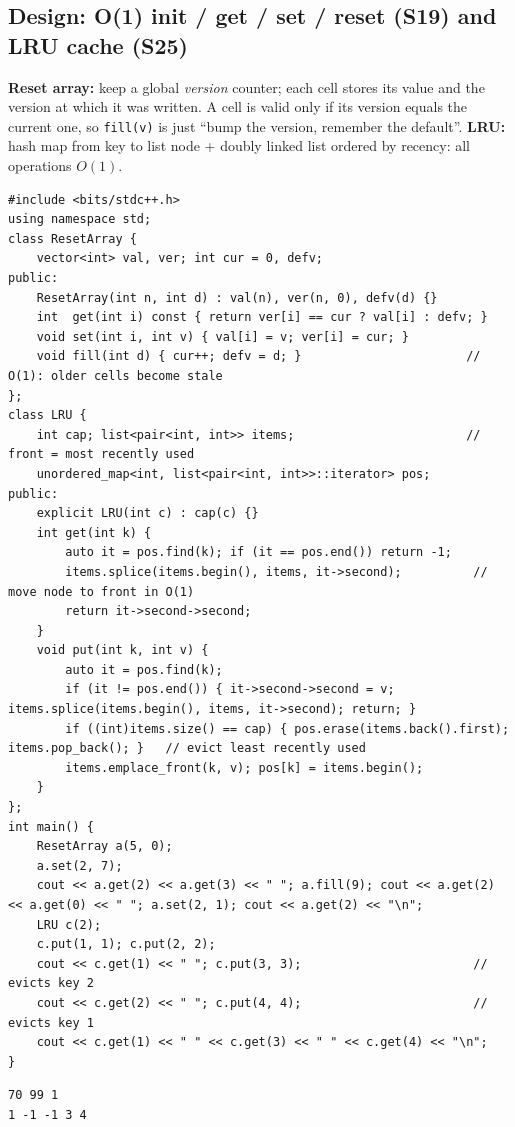 \documentclass[10pt,a4paper,openany,oneside]{report}
\begin{document}
\subsection{Design: O(1) init / get / set / reset (S19) and LRU cache (S25)}
\begin{srcbox}
\textbf{Reset array:} keep a global \emph{version} counter; each cell stores its value and the version at which it was written. A cell is valid only if its version equals the current one, so \texttt{fill(v)} is just ``bump the version, remember the default''.
\textbf{LRU:} hash map from key to list node + doubly linked list ordered by recency: all operations $O(1)$.
\end{srcbox}
\begin{lstlisting}[language={[11]C++}]
#include <bits/stdc++.h>
using namespace std;
class ResetArray {
    vector<int> val, ver; int cur = 0, defv;
public:
    ResetArray(int n, int d) : val(n), ver(n, 0), defv(d) {}
    int  get(int i) const { return ver[i] == cur ? val[i] : defv; }
    void set(int i, int v) { val[i] = v; ver[i] = cur; }
    void fill(int d) { cur++; defv = d; }                       // O(1): older cells become stale
};
class LRU {
    int cap; list<pair<int, int>> items;                        // front = most recently used
    unordered_map<int, list<pair<int, int>>::iterator> pos;
public:
    explicit LRU(int c) : cap(c) {}
    int get(int k) {
        auto it = pos.find(k); if (it == pos.end()) return -1;
        items.splice(items.begin(), items, it->second);          // move node to front in O(1)
        return it->second->second;
    }
    void put(int k, int v) {
        auto it = pos.find(k);
        if (it != pos.end()) { it->second->second = v; items.splice(items.begin(), items, it->second); return; }
        if ((int)items.size() == cap) { pos.erase(items.back().first); items.pop_back(); }   // evict least recently used
        items.emplace_front(k, v); pos[k] = items.begin();
    }
};
int main() {
    ResetArray a(5, 0);
    a.set(2, 7);
    cout << a.get(2) << a.get(3) << " "; a.fill(9); cout << a.get(2) << a.get(0) << " "; a.set(2, 1); cout << a.get(2) << "\n";
    LRU c(2);
    c.put(1, 1); c.put(2, 2);
    cout << c.get(1) << " "; c.put(3, 3);                        // evicts key 2
    cout << c.get(2) << " "; c.put(4, 4);                        // evicts key 1
    cout << c.get(1) << " " << c.get(3) << " " << c.get(4) << "\n";
}
\end{lstlisting}
\begin{lstlisting}[style=out,title={Answer: captured output}]
70 99 1
1 -1 -1 3 4
\end{lstlisting}
\end{document}
